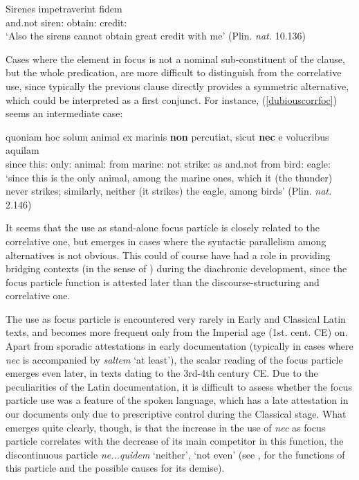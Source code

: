 \documentclass[output=paper,modfonts,nonflat,citecolor=brown,
showindex
]{langsci/langscibook}
\begin{document}
{\begin{exe}
\ex \label{focussirens}  Sirenes impetraverint fidem\\
and.not siren:{} obtain:{} credit:{}\\

`Also the sirens cannot obtain great credit with me' (Plin. {\em{nat.}} 10.136)
\end{exe}}

\noindent Cases where the element in focus is not a nominal sub-constituent of the clause, but the whole predication, are more difficult to distinguish from the correlative use, since typically the previous clause directly provides a symmetric alternative, which could be interpreted as a first conjunct. For instance, (\ref{dubiouscorrfoc}) seems an intermediate case:

{\begin{exe}
\ex \label{dubiouscorrfoc} \gll quoniam hoc solum animal ex marinis {\bf{non}} percutiat, sicut {\bf{nec}} e volucribus aquilam\\
since this:{} only:{} animal:{} from marine:{} not strike:{} as and.not from bird:{} eagle:{}\\

`since this is the only animal, among the marine ones, which it (the thunder) never strikes; similarly, neither (it strikes) the eagle, among birds' (Plin. {\em{nat.}} 2.146)
\end{exe}}

\noindent It seems that the use as stand-alone focus particle is closely related to the correlative one, but emerges in cases where the syntactic parallelism among alternatives is not obvious. This could of course have had a role in providing bridging contexts (in the sense of \citealt{Heine02}) during the diachronic development, since the focus particle function is attested later than the discourse-structuring and correlative one. 

The use as focus particle is encountered very rarely in Early and Classical Latin texts, and becomes more frequent only from the Imperial age (1st. cent. CE) on. Apart from sporadic attestations in early documentation (typically in cases where {\em{nec}} is accompanied by {\em{saltem}} `at least'), the scalar reading of the focus particle emerges even later, in texts dating to the 3rd-4th century CE. Due to the peculiarities of the Latin documentation, it is difficult to assess whether the focus particle use was a feature of the spoken language, which has a late attestation in our documents only due to prescriptive control during the Classical stage. What emerges quite clearly, though, is that the increase in the use of {\em{nec}} as focus particle correlates with the decrease of its main competitor in this function, the discontinuous particle {\em{ne...quidem}} `neither', `not even' (see \citealt[chapter 7]{Orlandini01}, \citealt[]{Gianollo17} for the functions of this particle and the possible causes for its demise).
\end{document}
